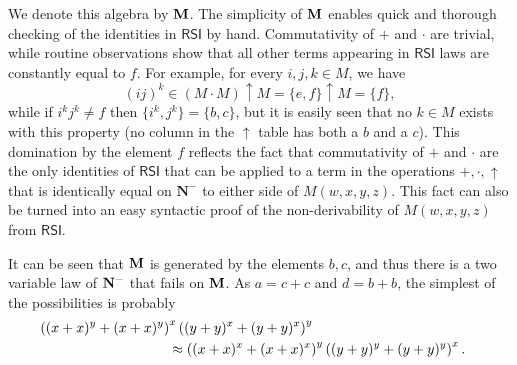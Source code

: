 \documentclass[eqnor,reqno]{amsart}
\theoremstyle{plain}
\theoremstyle{definition}
\newcommand{\RSI}{\textsf{RSI}}
\begin{document}
We denote this algebra by ${\bf M}$.
The simplicity of ${\bf M}$ enables quick and thorough
checking of the identities in $\RSI$ by hand.  
Commutativity of
$+$ and
$\cdot$ are trivial, while routine observations show that all
other terms appearing in $\RSI$ laws are constantly
equal to $f$.  
For example, for every $i,j,k\in M$, we have 
\[
(ij)^k\in
(M\cdot M)\uparrow M=\{e,f\}\uparrow M=\{f\},
\]
while if $i^kj^k\neq f$
then
$\{i^k,j^k\}=\{b,c\}$, but it is easily seen that no $k\in M$ exists with this
property (no column in the $\uparrow$ table has both a $b$ and a $c$). 
This domination by the element $f$ reflects the fact that commutativity
of $+$ and $\cdot$ are the only identities of
$\RSI$ that can be applied to a term in the operations $+,\cdot,
\uparrow$ that is identically equal on $\mathbf{N}^-$ to either side of
$M(w,x,y,z)$.  This fact can also be turned into an easy syntactic proof of
the non-derivability of
$M(w,x,y,z)$ from $\RSI$.


It can be seen that ${\bf M}$ is generated by the elements $b,c$, and thus there is a
two variable law of ${\bf N}^{-}$ that fails on ${\bf M}$.  As $a=c+c$
and
$d=b+b$, the simplest of the possibilities is probably
%
\begin{eqnarray*}
\lefteqn{\left( (x+x)^y+(x+x)^y\right)^x\left(
(y+y)^x+(y+y)^x\right)^y}&&\\
&\phantom{abcdefdghabcdefdgh}\approx 
\left( (x+x)^x+(x+x)^x\right)^y\left( (y+y)^y+(y+y)^y\right)^x.&
\end{eqnarray*} 
%
\end{document}
